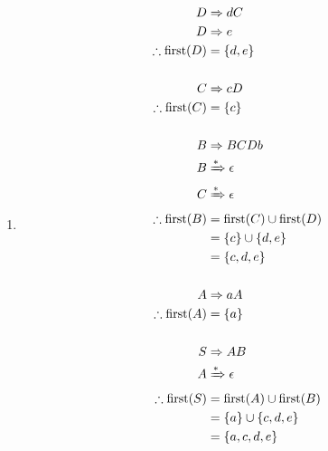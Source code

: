 \documentclass[12pt,a4paper]{article}
\newcommand{\first}{\mathrm{first}}
\begin{document}
\begin{enumerate}
\begin{enumerate}
    \newpage
    \item %
    \begin{multicols}{2}
    \begin{align*}
      D &\Rightarrow dC \\
      D &\Rightarrow e \\
      \therefore \first(D) &= \{d,e\} \\
      \smallskip \\
      C &\Rightarrow cD \\
      \therefore \first(C) &= \{c\} \\
      \smallskip \\
      B &\Rightarrow BCDb \\
      B &\xRightarrow{*} \epsilon \\
      C &\xRightarrow{*} \epsilon \\
      \therefore \first(B) &= \first(C) \cup \first(D) \\
                           &= \{c\} \cup \{d,e\} \\
                           &= \{c,d,e\} \\
      \smallskip \\
      A &\Rightarrow aA \\
      \therefore \first(A) &= \{a\} \\
      \smallskip \\
      S &\Rightarrow AB \\
      A &\xRightarrow{*} \epsilon \\
      \therefore \first(S) &= \first(A) \cup \first(B) \\
                           &= \{a\} \cup \{c,d,e\} \\
                           &= \{a,c,d,e\} \\
    \end{align*}


\end{multicols}
\end{enumerate}
\end{enumerate}
\end{document}
